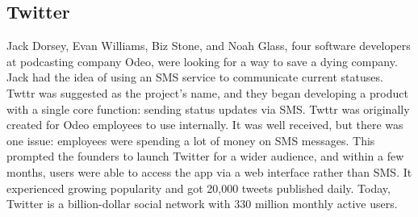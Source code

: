 \documentclass[paper=a4, fontsize=11pt]{scrartcl}
\numberwithin{equation}{section}		%
\numberwithin{figure}{section}			%
\numberwithin{table}{section}				%
\begin{document}
\subsection{Twitter}
Jack Dorsey, Evan Williams, Biz Stone, and Noah Glass, four software developers at podcasting company Odeo, were looking for a way to save a dying company. Jack had the idea of using an SMS service to communicate current statuses. Twttr was suggested as the project's name, and they began developing a product with a single core function: sending status updates via SMS. Twttr was originally created for Odeo employees to use internally. It was well received, but there was one issue: employees were spending a lot of money on SMS messages. This prompted the founders to launch Twitter for a wider audience, and within a few months, users were able to access the app via a web interface rather than SMS. It experienced growing popularity and got 20,000 tweets published daily. Today, Twitter is a billion-dollar social network with 330 million monthly active users.
\end{document}
